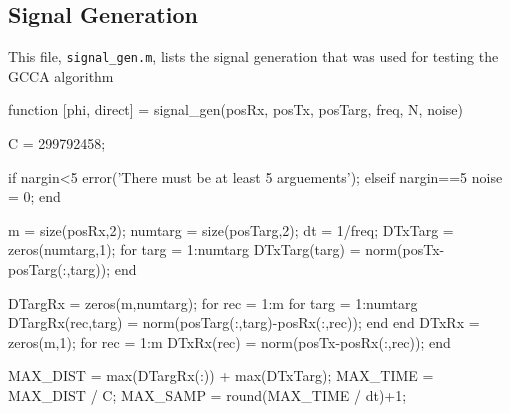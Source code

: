 \documentclass[12pt,openany,a4paper]{book}
\begin{document}
\subsection{Signal Generation}
\label{app:siggen1}
This file, \verb+signal_gen.m+, lists the signal generation that was used for testing the GCCA algorithm
\begin{spverbatim}
function [phi, direct] = signal_gen(posRx, posTx, posTarg, freq, N, noise)
%
%
%

C = 299792458;

%

if nargin<5
    error('There must be at least 5 arguements');
elseif nargin==5
    noise = 0;
end

m = size(posRx,2);
numtarg = size(posTarg,2);
dt = 1/freq;
DTxTarg = zeros(numtarg,1);
for targ = 1:numtarg
    DTxTarg(targ) = norm(posTx-posTarg(:,targ));
end

DTargRx = zeros(m,numtarg);
for rec = 1:m
    for targ = 1:numtarg
        DTargRx(rec,targ) = norm(posTarg(:,targ)-posRx(:,rec));
    end
end
DTxRx = zeros(m,1);
for rec = 1:m
    DTxRx(rec) = norm(posTx-posRx(:,rec));
end

MAX_DIST = max(DTargRx(:)) + max(DTxTarg);
MAX_TIME = MAX_DIST / C;
MAX_SAMP = round(MAX_TIME / dt)+1;


\end{spverbatim}
\end{document}
